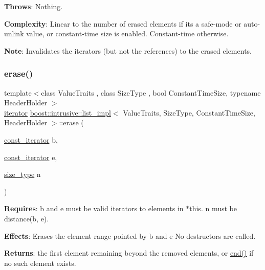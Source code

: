 {\bfseries Throws}\+: Nothing.

{\bfseries Complexity}\+: Linear to the number of erased elements if it\textquotesingle{}s a safe-\/mode or auto-\/unlink value, or constant-\/time size is enabled. Constant-\/time otherwise.

{\bfseries Note}\+: Invalidates the iterators (but not the references) to the erased elements. \mbox{\label{classboost_1_1intrusive_1_1list__impl_a8811c0530715a891ecd912674b54eb6c}} 
\subsubsection{\texorpdfstring{erase()}{erase()}\hspace{0.1cm}{\footnotesize\ttfamily [3/3]}}
{\footnotesize\ttfamily template$<$class Value\+Traits , class Size\+Type , bool Constant\+Time\+Size, typename Header\+Holder $>$ \\
\hyperlink{classboost_1_1intrusive_1_1list__impl_a15c0189bf62eb9fb98bc07ef10b8cb23}{iterator} \hyperlink{classboost_1_1intrusive_1_1list__impl}{boost\+::intrusive\+::list\+\_\+impl}$<$ Value\+Traits, Size\+Type, Constant\+Time\+Size, Header\+Holder $>$\+::erase (\begin{DoxyParamCaption}\item[{\hyperlink{classboost_1_1intrusive_1_1list__impl_af4ced710fe02662c5650d161af83d8cd}{const\+\_\+iterator}}]{b,  }\item[{\hyperlink{classboost_1_1intrusive_1_1list__impl_af4ced710fe02662c5650d161af83d8cd}{const\+\_\+iterator}}]{e,  }\item[{\hyperlink{classboost_1_1intrusive_1_1list__impl_a3e340b93081e392fba09de7145fb5733}{size\+\_\+type}}]{n }\end{DoxyParamCaption})\hspace{0.3cm}{\ttfamily [inline]}}

{\bfseries Requires}\+: b and e must be valid iterators to elements in $\ast$this. n must be distance(b, e).

{\bfseries Effects}\+: Erases the element range pointed by b and e No destructors are called.

{\bfseries Returns}\+: the first element remaining beyond the removed elements, or \hyperlink{classboost_1_1intrusive_1_1list__impl_af2a454471fced6d4b2fb899c50bbee67}{end()} if no such element exists.

